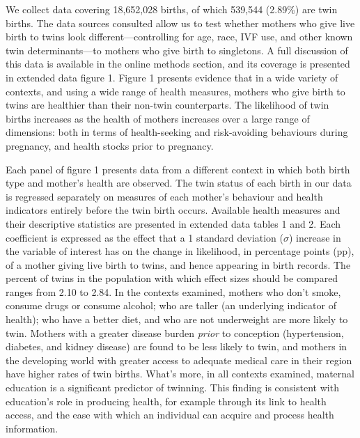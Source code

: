\documentclass{nature}
\begin{document}
\begin{linenumbers}
We collect data covering 18,652,028 births, of which 539,544 (2.89\%) are twin births. The data sources consulted allow us to test whether mothers who give live birth to twins look different---controlling for age, race, IVF use, and other known twin determinants\cite{Hoekstraetal2008}---to mothers who give birth to singletons. A full discussion of this data is available in the online methods section, and its coverage is presented in extended data figure 1.   Figure 1 presents evidence that in a wide variety of contexts, and using a wide range of health measures, mothers who give birth to twins are healthier than their non-twin counterparts. The likelihood of twin births increases as the health of mothers increases over a large range of dimensions: both in terms of health-seeking and risk-avoiding behaviours during pregnancy, and health stocks prior to pregnancy.

Each panel of figure 1 presents data from a different context in which both birth type and mother's health are observed. The twin status of each birth in our data is regressed separately on measures of each mother's behaviour and health indicators entirely before the twin birth occurs. Available health measures and their descriptive statistics are presented in extended data tables 1 and 2. Each coefficient is expressed as the effect that a 1 standard deviation ($\sigma$) increase in the variable of interest has on the change in likelihood, in percentage points (pp), of a mother giving live birth to twins, and hence appearing in birth records.  The percent of twins in the population with which effect sizes should be compared ranges from 2.10 to 2.84.  In the contexts examined, mothers who don't smoke, consume drugs or consume alcohol; who are taller (an underlying indicator of health\cite{Silventoinen2003,BhalotraRawlings2013}); who have a better diet, and who are not underweight are more likely to twin.  Mothers with a greater disease burden \emph{prior} to conception (hypertension, diabetes, and kidney disease) are found to be less likely to twin, and mothers in the developing world with greater access to adequate medical care in their region have higher rates of twin births.  What's more, in all contexts examined, maternal education is a significant predictor of twinning.  This finding is consistent with education's role in producing health, for example through its link to health access, and the ease with which an individual can acquire and process health information\cite{Kenkel1991,CutlerLlerasMuney2010}.


\end{linenumbers}
\end{document}
